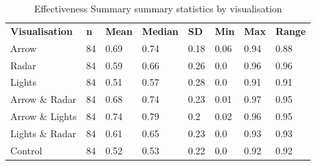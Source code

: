 \begin{table}[]
\caption{Effectiveness Summary summary statistics by visualisation}
\label{tab:Effectiveness_Summary}
\begin{tabular}{llllllll}
\textbf{Visualisation} & \textbf{n} & \textbf{Mean} & \textbf{Median} & \textbf{SD} & \textbf{Min} & \textbf{Max} & \textbf{Range} \\
Arrow                  & 84         & 0.69          & 0.74            & 0.18        & 0.06         & 0.94         & 0.88 \\
Radar                  & 84         & 0.59          & 0.66            & 0.26        & 0.0          & 0.96         & 0.96 \\
Lights                 & 84         & 0.51          & 0.57            & 0.28        & 0.0          & 0.91         & 0.91 \\
Arrow \& Radar         & 84         & 0.68          & 0.74            & 0.23        & 0.01         & 0.97         & 0.95 \\
Arrow \& Lights        & 84         & 0.74          & 0.79            & 0.2         & 0.02         & 0.96         & 0.95 \\
Lights \& Radar        & 84         & 0.61          & 0.65            & 0.23        & 0.0          & 0.93         & 0.93 \\
Control                & 84         & 0.52          & 0.53            & 0.22        & 0.0          & 0.92         & 0.92
\end{tabular}
\end{table}
